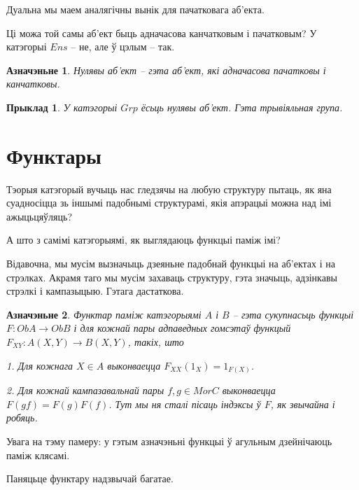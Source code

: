 \documentclass[a4paper,12pt]{book}
\newtheorem{example}{Прыклад}[section]
\newtheorem{definition}{Азначэньне}[section]
\begin{document}
Дуальна мы маем аналягічны вынік для пачатковага аб'екта.

Ці можа той самы аб'ект быць адначасова канчатковым і пачатковым? У
катэгорыі $Ens$ -- не, але ў цэлым -- так.

\begin{definition}
  Нулявы аб'ект -- гэта аб'ект, які адначасова пачатковы і канчатковы.
\end{definition}

\begin{example}
  У катэгорыі $Grp$ ёсьць нулявы аб'ект. Гэта трывіяльная група.
\end{example}

\section{Функтары}

Тэорыя катэгорый вучыць нас гледзячы на любую структуру пытаць, як яна
суадносіцца зь іншымі падобнымі структурамі, якія апэрацыі можна над
імі ажыцьцяўляць?

А што з самімі катэгорыямі, як выглядаюць функцыі паміж імі?

Відавочна, мы мусім вызначыць дзеяньне падобнай функцыі на аб'ектах і
на стрэлках. Акрамя таго мы мусім захаваць структуру, гэта значыць,
адзінкавы стрэлкі і кампазыцыю. Гэтага дастаткова.

\begin{definition}
  Функтар паміж катэгорыямі $A$ і $B$ -- гэта сукупнасьць функцыі
  $F:Ob A \rightarrow Ob B$ і для кожнай пары адпаведных гомсэтаў
  функцый $F_{XY}: A(X, Y) \rightarrow B(X, Y)$, такіх, што

  1. Для кожнага $X \in A$ выконваецца $F_{XX}(1_X) = 1_{F(X)}$.

  2. Для кожнай кампазавальнай пары $f, g \in Mor C$ выконваецца
  $F(gf) = F(g)F(f)$. Тут мы ня сталі пісаць індэксы ў $F$, як
  звычайна і робяць.
\end{definition}

Увага на тэму памеру: у гэтым азначэньні функцыі ў агульным
дзейнічаюць паміж клясамі.

Паняцьце функтару надзвычай багатае.
\end{document}
